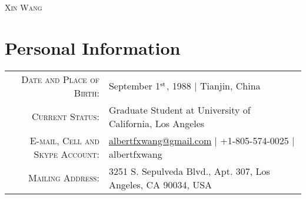 \documentclass[letterpaper,10pt]{article}
\begin{document}
\par{\centering
  {\huge \textsc{Xin Wang}}
\par}

\section{Personal Information}
\begin{tabular}{rl}
    \textsc{Date and Place of Birth:}       & September 1$^{\rm st}$, 1988  |  Tianjin, China \\
    \textsc{Current Status:}  & Graduate Student at University of California, Los Angeles \\
    \textsc{E-mail, Cell and Skype Account:}  & \href{mailto:albertfxwang@gmail.com}{albertfxwang@gmail.com}  |  +1-805-574-0025  |  albertfxwang \\
    \textsc{Mailing Address:} & 3251 S. Sepulveda Blvd., Apt. 307, Los Angeles, CA 90034, USA \\
\end{tabular}


\end{document}
